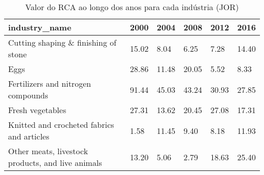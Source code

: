 \begin{table}
\centering
\caption{Valor do RCA ao longo dos anos para cada indústria (JOR)}
\begin{tabular}{p{6cm}p{1.5cm}p{1.5cm}p{1.5cm}p{1.5cm}p{1.5cm}}
\toprule
                                    industry\_name &  2000 &  2004 &  2008 &  2012 &  2016 \\
\midrule
             Cutting shaping \& finishing of stone & 15.02 &  8.04 &  6.25 &  7.28 & 14.40 \\
                                             Eggs & 28.86 & 11.48 & 20.05 &  5.52 &  8.33 \\
               Fertilizers and nitrogen compounds & 91.44 & 45.03 & 43.24 & 30.93 & 27.85 \\
                                 Fresh vegetables & 27.31 & 13.62 & 20.45 & 27.08 & 17.31 \\
       Knitted and crocheted fabrics and articles &  1.58 & 11.45 &  9.40 &  8.18 & 11.93 \\
Other meats, livestock products, and live animals & 13.20 &  5.06 &  2.79 & 18.63 & 25.40 \\
\bottomrule
\end{tabular}
\end{table}
